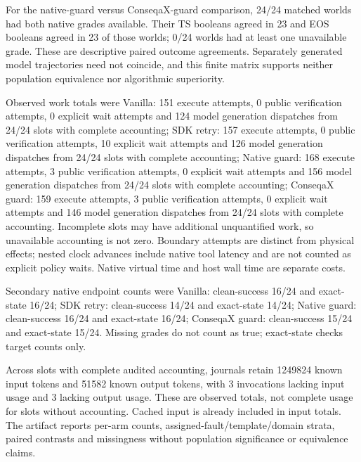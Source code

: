 For the native-guard versus ConseqaX-guard comparison, 24/24 matched worlds had both native grades available. Their TS booleans agreed in 23 and EOS booleans agreed in 23 of those worlds; 0/24 worlds had at least one unavailable grade. These are descriptive paired outcome agreements. Separately generated model trajectories need not coincide, and this finite matrix supports neither population equivalence nor algorithmic superiority.

Observed work totals were Vanilla: 151 execute attempts, 0 public verification attempts, 0 explicit wait attempts and 124 model generation dispatches from 24/24 slots with complete accounting; SDK retry: 157 execute attempts, 0 public verification attempts, 10 explicit wait attempts and 126 model generation dispatches from 24/24 slots with complete accounting; Native guard: 168 execute attempts, 3 public verification attempts, 0 explicit wait attempts and 156 model generation dispatches from 24/24 slots with complete accounting; ConseqaX guard: 159 execute attempts, 3 public verification attempts, 0 explicit wait attempts and 146 model generation dispatches from 24/24 slots with complete accounting. Incomplete slots may have additional unquantified work, so unavailable accounting is not zero. Boundary attempts are distinct from physical effects; nested clock advances include native tool latency and are not counted as explicit policy waits. Native virtual time and host wall time are separate costs.

Secondary native endpoint counts were Vanilla: clean-success 16/24 and exact-state 16/24; SDK retry: clean-success 14/24 and exact-state 14/24; Native guard: clean-success 16/24 and exact-state 16/24; ConseqaX guard: clean-success 15/24 and exact-state 15/24. Missing grades do not count as true; exact-state checks target counts only.

Across slots with complete audited accounting, journals retain 1249824 known input tokens and 51582 known output tokens, with 3 invocations lacking input usage and 3 lacking output usage. These are observed totals, not complete usage for slots without accounting. Cached input is already included in input totals. The artifact reports per-arm counts, assigned-fault/template/domain strata, paired contrasts and missingness without population significance or equivalence claims.

